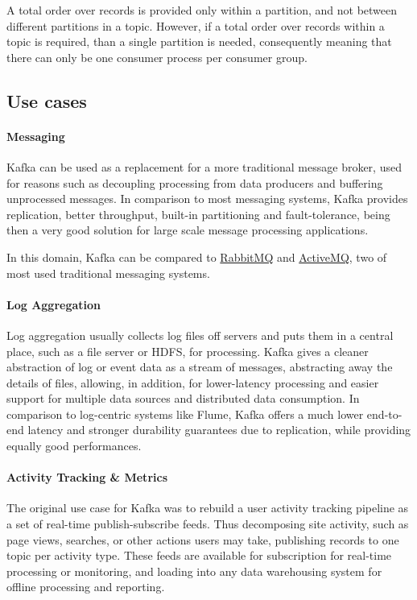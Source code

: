 A total order over records is provided only within a partition, and not between different partitions in a topic. However, if a total order over records within a topic is required, than a single partition is needed, consequently meaning that there can only be one consumer process per consumer group. 

\subsection{Use cases}

\paragraph{Messaging}

Kafka can be used as a replacement for a more traditional message broker, used for reasons such as decoupling processing from data producers and buffering unprocessed messages. In comparison to most messaging systems, Kafka provides replication, better throughput, built-in partitioning and fault-tolerance, being then a very good solution for large scale message processing applications.

In this domain, Kafka can be compared to  \href{https://www.rabbitmq.com/}{RabbitMQ} and \href{http://activemq.apache.org/}{ActiveMQ}, two of most used traditional messaging systems.

\paragraph{Log Aggregation}

Log aggregation usually collects log files off servers and puts them in a central place, such as a file server or HDFS, for processing. Kafka gives a cleaner abstraction of log or event data as a stream of messages, abstracting away the details of files, allowing, in addition, for lower-latency processing and easier support for multiple data sources and distributed data consumption. In comparison to log-centric systems like Flume, Kafka offers a much lower end-to-end latency and stronger durability guarantees due to replication, while providing equally good performances. 
 
\paragraph{Activity Tracking \& Metrics}

The original use case for Kafka was to rebuild a user activity tracking pipeline as a set of real-time publish-subscribe feeds. Thus decomposing site activity, such as page views, searches, or other actions users may take, publishing records to one topic per activity type. These feeds are available for subscription for  real-time processing or monitoring, and loading into any data warehousing system for offline processing and reporting.

